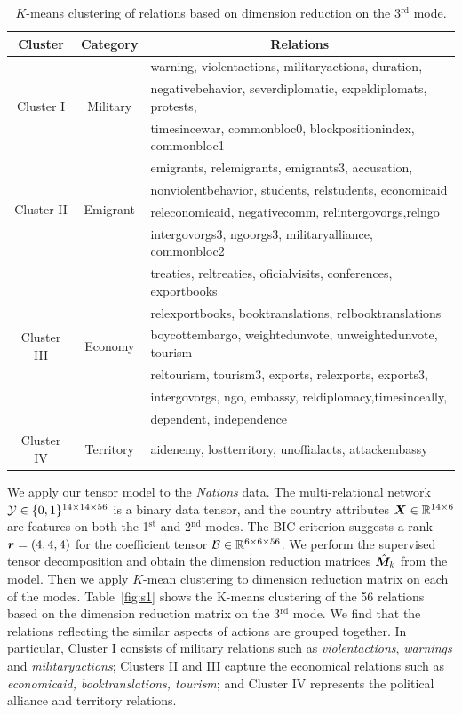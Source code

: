 \documentclass[12pt]{article}
\theoremstyle{definition}
\theoremstyle{definition}
\begin{document}
\begin{table}[H]
\begin{tabular}{c|c|l}
Cluster & Category & \multicolumn{1}{c}{Relations}\\
\hline
\hline
\multirow{3}{*}{Cluster I}  & \multirow{3}{*}{Military} & warning,           violentactions, militaryactions, duration,\\ &&negativebehavior, severdiplomatic, expeldiplomats, protests,\\
&&timesincewar, commonbloc0, blockpositionindex, commonbloc1\\   
\hline
\multirow{4}{*}{Cluster II}& \multirow{4}{*}{Emigrant} & emigrants, relemigrants, emigrants3, accusation, \\      
&&nonviolentbehavior, students, relstudents, economicaid\\
&&releconomicaid, negativecomm, relintergovorgs,relngo\\
&&intergovorgs3, ngoorgs3, militaryalliance, commonbloc2\\    
\hline
\multirow{6}{*}{Cluster III} & \multirow{6}{*}{Economy} & treaties, reltreaties, oficialvisits, conferences, exportbooks\\
&& relexportbooks, booktranslations, relbooktranslations\\
&&boycottembargo, weightedunvote, unweightedunvote, tourism\\
&&reltourism, tourism3, exports, relexports, exports3, \\
&&intergovorgs, ngo, embassy, reldiplomacy,timesinceally,\\
&& dependent, independence\\
\hline
Cluster IV & Territory &aidenemy, lostterritory, unoffialacts, attackembassy\\
\hline
\end{tabular}
\caption{$K$-means clustering of relations based on dimension reduction on the 3$^\text{rd}$ mode. }\label{tab:s1}
\end{table}


We apply our tensor model to the \emph{Nations} data. The multi-relational network $\mathcal{Y}\in\{0,1\}^{14\times 14\times 56}$ is a binary data tensor, and the country attributes $\bm X\in\mathbb{R}^{14\times 6}$ are features on both the 1$^\text{st}$ and 2$^\text{nd}$ modes. The BIC criterion suggests a rank $\bm{r}=(4,4,4)$ for the coefficient tensor $\mathcal{B}\in\mathbb{R}^{6\times 6 \times 56}$. 
We perform the supervised tensor decomposition and obtain the dimension reduction matrices $\hat {\bm M}_k$ from the model. Then we apply $K$-mean clustering to dimension reduction matrix on each of the modes. Table~\ref{fig:s1} shows the K-means clustering of the 56 relations based on the dimension reduction matrix on the 3$^\text{rd}$ mode. We find that the relations reflecting the similar aspects of actions are grouped together. In particular, Cluster I consists of military relations such as \emph{violentactions}, \emph{warnings} and \emph{militaryactions}; Clusters II and III capture the economical relations such as \emph{economicaid, booktranslations, tourism}; and Cluster IV represents the political alliance and territory relations. 
\end{document}

